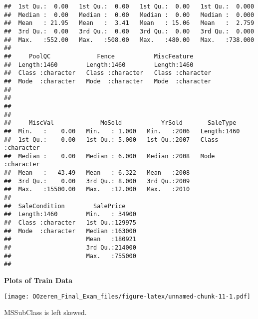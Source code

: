 \documentclass[]{article}
\newenvironment{Shaded}{\begin{snugshade}}{\end{snugshade}}
\newcommand{\KeywordTok}[1]{\textcolor[rgb]{0.13,0.29,0.53}{\textbf{#1}}}
\newcommand{\DataTypeTok}[1]{\textcolor[rgb]{0.13,0.29,0.53}{#1}}
\newcommand{\StringTok}[1]{\textcolor[rgb]{0.31,0.60,0.02}{#1}}
\newcommand{\OperatorTok}[1]{\textcolor[rgb]{0.81,0.36,0.00}{\textbf{#1}}}
\newcommand{\NormalTok}[1]{#1}
\begin{document}
\begin{verbatim}
##  1st Qu.:  0.00   1st Qu.:  0.00   1st Qu.:  0.00   1st Qu.:  0.000  
##  Median :  0.00   Median :  0.00   Median :  0.00   Median :  0.000  
##  Mean   : 21.95   Mean   :  3.41   Mean   : 15.06   Mean   :  2.759  
##  3rd Qu.:  0.00   3rd Qu.:  0.00   3rd Qu.:  0.00   3rd Qu.:  0.000  
##  Max.   :552.00   Max.   :508.00   Max.   :480.00   Max.   :738.000  
##                                                                      
##     PoolQC             Fence           MiscFeature       
##  Length:1460        Length:1460        Length:1460       
##  Class :character   Class :character   Class :character  
##  Mode  :character   Mode  :character   Mode  :character  
##                                                          
##                                                          
##                                                          
##                                                          
##     MiscVal             MoSold           YrSold       SaleType        
##  Min.   :    0.00   Min.   : 1.000   Min.   :2006   Length:1460       
##  1st Qu.:    0.00   1st Qu.: 5.000   1st Qu.:2007   Class :character  
##  Median :    0.00   Median : 6.000   Median :2008   Mode  :character  
##  Mean   :   43.49   Mean   : 6.322   Mean   :2008                     
##  3rd Qu.:    0.00   3rd Qu.: 8.000   3rd Qu.:2009                     
##  Max.   :15500.00   Max.   :12.000   Max.   :2010                     
##                                                                       
##  SaleCondition        SalePrice     
##  Length:1460        Min.   : 34900  
##  Class :character   1st Qu.:129975  
##  Mode  :character   Median :163000  
##                     Mean   :180921  
##                     3rd Qu.:214000  
##                     Max.   :755000  
## 
\end{verbatim}

\textbf{Plots of Train Data}

\begin{Shaded}
\end{Shaded}

\texttt{[image: OOzeren\_Final\_Exam\_files/figure-latex/unnamed-chunk-11-1.pdf]}

MSSubClass is left skewed.
\end{document}
